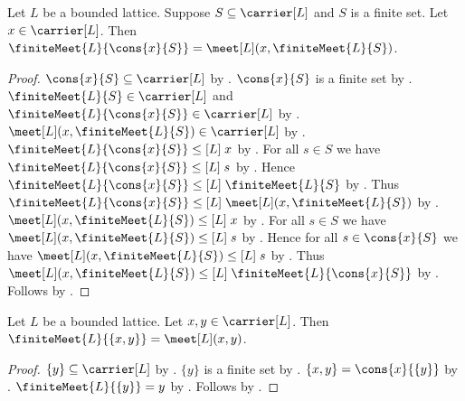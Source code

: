 \begin{proposition}\label{finite_meet_cons}
    Let $L$ be a bounded lattice.
    Suppose $S\subseteq\carrier[L]$ and $S$ is a finite set.
    Let $x\in\carrier[L]$.
    Then
        $\finiteMeet{L}{\cons{x}{S}}
            =\meet[L](x,\finiteMeet{L}{S})$.
\end{proposition}
\begin{proof}
    $\cons{x}{S}\subseteq\carrier[L]$ by
        .
    $\cons{x}{S}$ is a finite set by .
    $\finiteMeet{L}{S}\in\carrier[L]$ and
        $\finiteMeet{L}{\cons{x}{S}}\in\carrier[L]$ by
        .
    $\meet[L](x,\finiteMeet{L}{S})\in\carrier[L]$ by
        .
    $\finiteMeet{L}{\cons{x}{S}}\mathrel{\leq[L]}x$ by
        .
    For all $s\in S$ we have
        $\finiteMeet{L}{\cons{x}{S}}\mathrel{\leq[L]}s$ by
        .
    Hence $\finiteMeet{L}{\cons{x}{S}}
        \mathrel{\leq[L]}\finiteMeet{L}{S}$ by
        .
    Thus $\finiteMeet{L}{\cons{x}{S}}
        \mathrel{\leq[L]}\meet[L](x,\finiteMeet{L}{S})$ by
        .
    $\meet[L](x,\finiteMeet{L}{S})\mathrel{\leq[L]}x$ by
        .
    For all $s\in S$ we have
        $\meet[L](x,\finiteMeet{L}{S})\mathrel{\leq[L]}s$ by
        .
    Hence for all $s\in\cons{x}{S}$ we have
        $\meet[L](x,\finiteMeet{L}{S})\mathrel{\leq[L]}s$ by
        .
    Thus $\meet[L](x,\finiteMeet{L}{S})
        \mathrel{\leq[L]}\finiteMeet{L}{\cons{x}{S}}$ by
        .
    Follows by
        .
\end{proof}

\begin{proposition}\label{finite_meet_pair}
    Let $L$ be a bounded lattice.
    Let $x,y\in\carrier[L]$.
    Then $\finiteMeet{L}{\{x,y\}}=\meet[L](x,y)$.
\end{proposition}
\begin{proof}
    $\{y\}\subseteq\carrier[L]$ by .
    $\{y\}$ is a finite set by .
    $\{x,y\}=\cons{x}{\{y\}}$ by
        .
    $\finiteMeet{L}{\{y\}}=y$ by .
    Follows by .
\end{proof}

